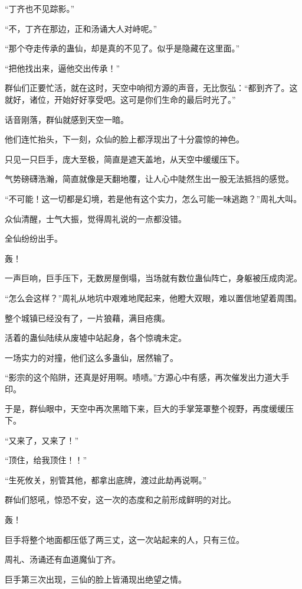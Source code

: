 \begin{this_body}
“丁齐也不见踪影。”

“不，丁齐在那边，正和汤诵大人对峙呢。”

“那个夺走传承的蛊仙，却是真的不见了。似乎是隐藏在这里面。”

“把他找出来，逼他交出传承！”

群仙们正要忙活，就在这时，天空中响彻方源的声音，无比恢弘：“都到齐了。这就好，诸位，开始好好享受吧。这可是你们生命的最后时光了。”

话音刚落，群仙就感到天空一暗。

他们连忙抬头，下一刻，众仙的脸上都浮现出了十分震惊的神色。

只见一只巨手，庞大至极，简直是遮天盖地，从天空中缓缓压下。

气势磅礴浩瀚，简直就像是天翻地覆，让人心中陡然生出一股无法抵挡的感觉。

“不可能！这一切都是幻境，若是他有这个实力，怎么可能一味逃跑？”周礼大叫。

众仙清醒，士气大振，觉得周礼说的一点都没错。

全仙纷纷出手。

轰！

一声巨响，巨手压下，无数房屋倒塌，当场就有数位蛊仙阵亡，身躯被压成肉泥。

“怎么会这样？”周礼从地坑中艰难地爬起来，他瞪大双眼，难以置信地望着周围。

整个城镇已经没有了，一片狼藉，满目疮痍。

活着的蛊仙陆续从废墟中站起身，各个惊魂未定。

一场实力的对撞，他们这么多蛊仙，居然输了。

“影宗的这个陷阱，还真是好用啊。啧啧。”方源心中有感，再次催发出力道大手印。

于是，群仙眼中，天空中再次黑暗下来，巨大的手掌笼罩整个视野，再度缓缓压下。

“又来了，又来了！”

“顶住，给我顶住！！”

“生死攸关，别管其他，都拿出底牌，渡过此劫再说啊。”

群仙们怒吼，惊恐不安，这一次的态度和之前形成鲜明的对比。

轰！

巨手将整个地面都压低了两三丈，这一次站起来的人，只有三位。

周礼、汤诵还有血道魔仙丁齐。

巨手第三次出现，三仙的脸上皆涌现出绝望之情。


\end{this_body}
